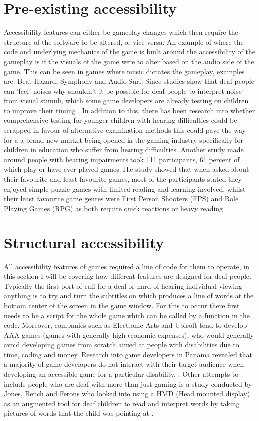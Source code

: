 \documentclass{scrartcl}
\begin{document}
\section{Pre-existing accessibility}
Accessibility features can either be gameplay changes which then require the structure of the software to be altered, or vice versa. An example of where the code and underlying mechanics of the game is built around the accessibility of the gameplay is if the visuals of the game were to alter based on the audio side of the game. This can be seen in games where music dictates the gameplay, examples are: Beat Hazard\cite {game:beathazard}, Symphony\cite {game:symphony} and Audio Surf\cite {game:audiosurf}. Since studies show that deaf people can 'feel' noises \cite {Nanayakkara} why shouldn't it be possible for deaf people to interpret noise from visual stimuli, which some game developers are already testing on children to improve their timing  \cite {Jouhtimaki}. In addition to this, there has been research into whether comprehensive testing for younger children with hearing difficulties could be scrapped in favour of alternative examination methods \cite{Mich} this could pave the way for a a brand new market being opened in the gaming industry specifically for children in education who suffer from hearing difficulties. Another study made around people with hearing impairments took 111 participants, 61 percent of which play or have ever played games\cite {Coutinho} The study showed that when asked about their favourite and least favourite games, most of the participants stated they enjoyed simple puzzle games with limited reading and learning involved, whilst their least favourite game genres were First Person Shooters (FPS) and Role Playing Games (RPG) as both require quick reactions or heavy reading \cite {Coutinho}

\section{Structural accessibility}
All accessibility features of games required a line of code for them to operate, in this section I will be covering how different features are designed for deaf people.
Typically the first port of call for a deaf or hard of hearing individual viewing anything is to try and turn the subtitles on which produces a line of words at the bottom center of the screen in the game window. For this to occur there first needs to be a script for the whole game which can be called by a function in the code. Moreover, companies such as Electronic Arts and Ubisoft tend to develop AAA games (games with generally high economic expenses), who would generally avoid developing games from scratch aimed at people with disabilities due to time, coding and money. Research into game developers in Panama revealed that a majority of game developers do not interact with their target audience when developing an accessible game for a particular disability. \cite {moreno}. Other attempts to include people who are deaf with more than just gaming is a study conducted by Jones, Bench and Ferons who looked into using a HMD (Head mounted display) as an augmented tool for deaf children to read and interpret words by taking pictures of words that the child was pointing at \cite {Jones}.
\end{document}

